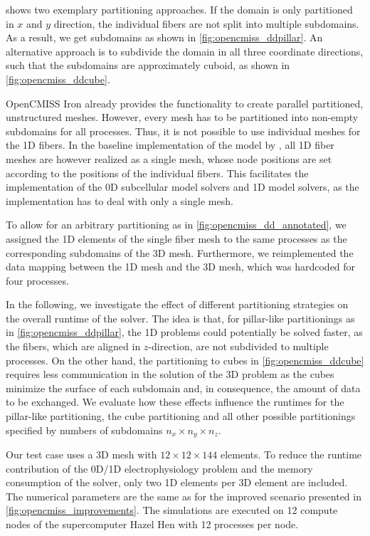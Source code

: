  shows two exemplary partitioning approaches. If the domain is only partitioned in $x$ and $y$ direction, the individual fibers are not split into multiple subdomains. As a result, we get  subdomains as shown in \cref{fig:opencmiss_ddpillar}. An alternative approach is to subdivide the domain in all three coordinate directions, such that the subdomains are approximately cuboid, as shown in \cref{fig:opencmiss_ddcube}.

OpenCMISS Iron already provides the functionality to create parallel partitioned, unstructured meshes. However, every mesh has to be partitioned into non-empty subdomains for all processes. Thus, it is not possible to use individual meshes for the 1D fibers.
In the baseline implementation of the model by \cite{Heidlauf2013}, all 1D fiber meshes are however realized as a single mesh, whose node positions are set according to the positions of the individual fibers. This facilitates the implementation of the 0D subcellular model solvers and 1D model solvers, as the implementation has to deal with only a single mesh. 

To allow for an arbitrary partitioning as in \cref{fig:opencmiss_dd_annotated}, we assigned the 1D elements of the single fiber mesh to the same processes as the corresponding subdomains of the 3D mesh. Furthermore, we reimplemented the data mapping between the 1D mesh and the 3D mesh, which was hardcoded for four processes.

In the following, we investigate the effect of different partitioning strategies on the overall runtime of the solver. The idea is that, for pillar-like partitionings as in \cref{fig:opencmiss_ddpillar}, the 1D problems could potentially be solved faster, as the fibers, which are aligned in $z$-direction, are not subdivided to multiple processes. On the other hand, the partitioning to cubes in \cref{fig:opencmiss_ddcube} requires less communication in the solution of the 3D problem as the cubes minimize the surface of each subdomain and, in consequence, the amount of data to be exchanged. We evaluate how these effects influence the runtimes for the pillar-like partitioning, the cube partitioning and all other possible partitionings specified by numbers of subdomains $n_x \times n_y \times n_z$.

Our test case uses a 3D mesh with $12 \times 12 \times 144$ elements. To reduce the runtime contribution of the 0D/1D electrophysiology problem and the memory consumption of the solver, only two 1D elements per 3D element are included. The numerical parameters are the same as for the improved scenario presented in \cref{fig:opencmiss_improvements}. The simulations are executed on 12 compute nodes of the supercomputer Hazel Hen with 12 processes per node.

